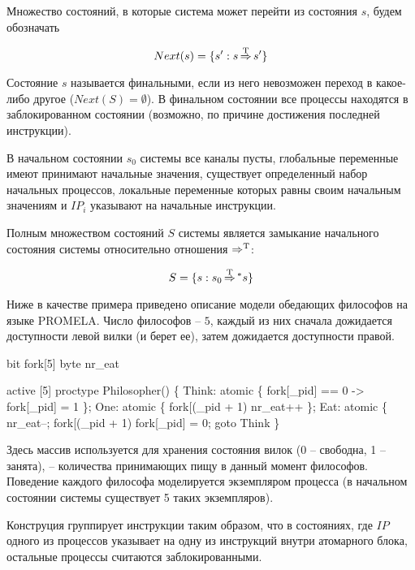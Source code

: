 Множество состояний, в которые система может перейти из состояния $s$,
будем обозначать

\begin{equation}
  \label{eq:next-def}
  Next(s) = \{ s': s \operatorname{\operatorname*{\Rightarrow}^T} s' \}
\end{equation}

Состояние $s$ называется финальными, если из него невозможен переход в
какое-либо другое ($Next(S) = \emptyset$). В финальном состоянии все
процессы находятся в заблокированном состоянии (возможно, по причине
достижения последней инструкции).

В начальном состоянии $s_0$ системы все каналы пусты, глобальные переменные
имеют принимают начальные значения, существует определенный набор
начальных процессов, локальные переменные которых равны своим
начальным значениям и $IP_i$ указывают на начальные инструкции. 

Полным множеством состояний $S$ системы является замыкание начального
состояния системы относительно отношения $\operatorname{\operatorname*{\Rightarrow}^T}$:

\begin{equation}
  \label{eq:statespace-def}
  S = \{s: s_0 \operatorname{\operatorname*{\Rightarrow}^T} \mbox{}^* s\}
\end{equation}

Ниже в качестве примера приведено описание модели обедающих философов
на языке PROMELA. Число философов -- $5$, каждый из них сначала
дожидается доступности левой вилки (и берет ее), затем дожидается
доступности правой.

\begin{CodeBlock}
bit  fork[5]
byte nr_eat

active [5] proctype Philosopher() \{
Think:
  atomic \{ fork[_pid] == 0 -> fork[_pid] = 1 \};
One:
  atomic \{ fork[(_pid + 1)%
           nr_eat++ \};
Eat:
  atomic \{ nr_eat--; fork[(_pid + 1)%
  fork[_pid] = 0;
  goto Think
\}  
\end{CodeBlock}

Здесь массив  используется для хранения состояния вилок (0
-- свободна, 1 -- занята),  -- количества принимающих
пищу в данный момент философов. Поведение каждого философа
моделируется экземпляром процесса  (в начальном
состоянии системы существует 5 таких экземпляров).

Конструция  группирует инструкции таким образом, что
в состояниях, где $IP$ одного из процессов указывает на одну из
инструкций внутри атомарного блока, остальные процессы считаются
заблокированными.

